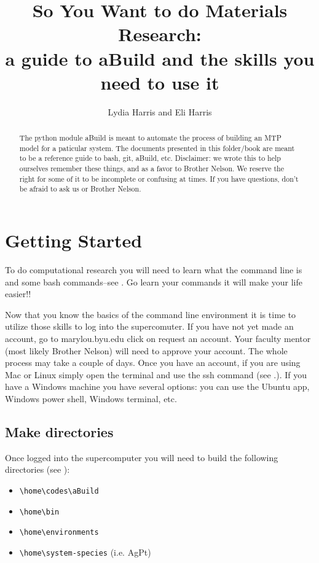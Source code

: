 \documentclass{article}
\title{So You Want to do Materials Research:\\[0.02em]\smaller{}a
guide to aBuild and the skills you need to use it}
\author{Lydia Harris and Eli Harris}
\begin{document}
\maketitle
\begin{abstract}
 The python module aBuild is meant to automate the process of
 building an MTP model for a paticular system. The documents presented
 in this folder/book are meant to be a reference guide to bash, git,
 aBuild, etc. Disclaimer: we wrote this to help ourselves remember
 these things, and as a favor to Brother Nelson. We reserve the right
 for some of it to be incomplete or confusing at times. If you have
 questions, don't be afraid to ask us or Brother Nelson. 
\end{abstract}

\section{Getting Started}
To do computational research you will need to learn what the command
line is and some bash commands--see . Go
learn your commands it will make your life easier!! 

Now that you know the basics of the command line environment it is
time to utilize those skills to log into the supercomuter. If you have
not yet made an account, go to marylou.byu.edu click on request an
account. Your faculty mentor (most likely Brother Nelson) will need to
approve your account. The whole process may take a couple of
days. Once you have an account, if you are using Mac or Linux simply
open the terminal and use the ssh command (see
.). If you have a Windows machine you have several
options: you can use the Ubuntu app, Windows power shell, Windows
terminal, etc.   

\subsection{Make directories}
Once logged into the supercomputer you will need to build the
following directories (see ):
\begin{itemize}
  \item{\verb|\home\codes\aBuild|}
  \item{\verb|\home\bin|}
  \item{\verb|\home\environments|}
  \item{\verb|\home\system-species| (i.e. AgPt)}
\end{itemize}
\end{document}
